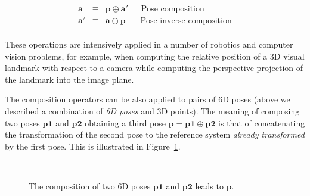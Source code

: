 \documentclass[a4paper,11pt]{report}
\begin{document}
\begin{eqnarray*}
\mathbf{a} & \equiv & \mathbf{p} \oplus \mathbf{a}'   ~~~~~~~ \textrm{Pose composition} \\
\mathbf{a'} & \equiv & \mathbf{a} \ominus \mathbf{p}  ~~~~~~~~ \textrm{Pose inverse composition} \\
\end{eqnarray*}

These operations are intensively applied in a number of robotics and computer vision 
problems, for example, when computing the relative position of a 3D visual landmark 
with respect to a camera while computing the perspective projection of the landmark 
into the image plane.

The composition operators can be also applied to pairs of 6D poses (above we described a combination
of \emph{6D poses} and {3D points}). 
The meaning of composing two poses $\mathbf{p1}$ and $\mathbf{p2}$ 
obtaining a third pose $\mathbf{p} = \mathbf{p1} \oplus \mathbf{p2}$ 
is that of concatenating the transformation of the second pose to the reference system
\emph{already transformed} by the first pose. 
This is illustrated in Figure~\ref{fig:comp_2poses}. 

\begin{figure}[h!]
\centering
{}
 \\
\caption{The composition of two 6D poses $\mathbf{p1}$ and $\mathbf{p2}$ leads to $\mathbf{p}$.}
\label{fig:comp_2poses}
\end{figure}
\end{document}
